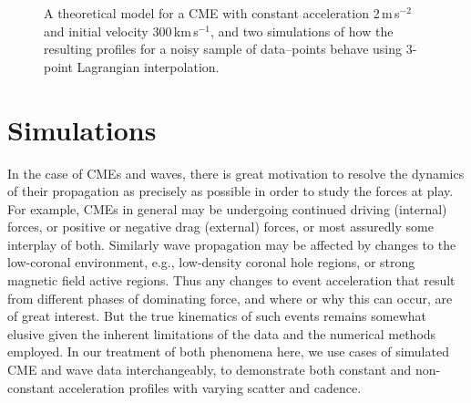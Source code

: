 \documentclass[structabstract]{aa}
\begin{document}
\begin{figure}[!ht]
\caption{A theoretical model for a CME with constant acceleration 2\,m\,s$^{-2}$ and initial velocity 300\,km\,s$^{-1}$, and two simulations of how the resulting profiles for a noisy sample of data--points behave using 3-point Lagrangian interpolation.}
\label{sim_vels_thesis}
\end{figure}

\section{Simulations}
\label{sect:simul1}

In the case of CMEs and waves, there is great motivation to resolve the dynamics of their propagation as precisely as possible in order to study the forces at play. For example, CMEs in general may be undergoing continued driving (internal) forces, or positive or negative drag (external) forces, or most assuredly some interplay of both. Similarly wave propagation may be affected by changes to the low-coronal environment, e.g., low-density coronal hole regions, or strong magnetic field active regions. Thus any changes to event acceleration that result from different phases of dominating force, and where or why this can occur, are of great interest. But the true kinematics of such events remains somewhat elusive given the inherent limitations of the data and the numerical methods employed. In our treatment of both phenomena here, we use cases of simulated CME and wave data interchangeably, to demonstrate both constant and non-constant acceleration profiles with varying scatter and cadence.
\end{document}
